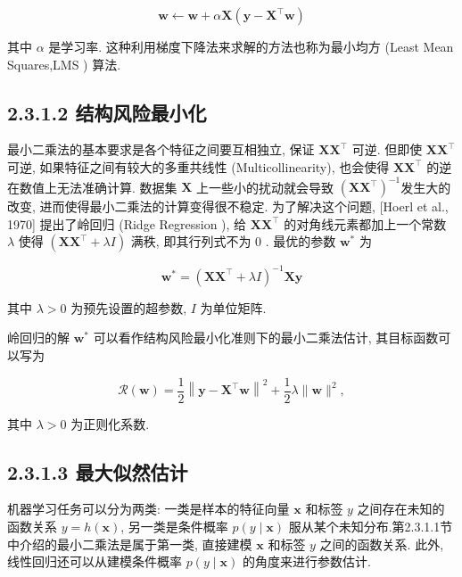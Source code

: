 \documentclass[10pt]{article}
\begin{document}
\begin{equation*}
\boldsymbol{w} \leftarrow \boldsymbol{w}+\alpha \boldsymbol{X}\left(\boldsymbol{y}-\boldsymbol{X}^{\top} \boldsymbol{w}\right) \tag{2.42}
\end{equation*}


其中 $\alpha$ 是学习率. 这种利用梯度下降法来求解的方法也称为最小均方 (Least Mean Squares,LMS ) 算法.

\subsection*{2.3.1.2 结构风险最小化}
最小二乘法的基本要求是各个特征之间要互相独立, 保证 $\boldsymbol{X} \boldsymbol{X}^{\top}$ 可逆. 但即使 $\boldsymbol{X} \boldsymbol{X}^{\top}$ 可逆, 如果特征之间有较大的多重共线性 (Multicollinearity), 也会使得 $\boldsymbol{X} \boldsymbol{X}^{\top}$ 的逆在数值上无法准确计算. 数据集 $\boldsymbol{X}$ 上一些小的扰动就会导致 $\left(\boldsymbol{X} \boldsymbol{X}^{\top}\right)^{-1}$发生大的改变, 进而使得最小二乘法的计算变得很不稳定. 为了解决这个问题, [Hoerl et al., 1970] 提出了岭回归 (Ridge Regression ), 给 $\boldsymbol{X} \boldsymbol{X}^{\top}$ 的对角线元素都加上一个常数 $\lambda$ 使得 $\left(\boldsymbol{X} \boldsymbol{X}^{\top}+\lambda I\right)$ 满秩, 即其行列式不为 0 . 最优的参数 $\boldsymbol{w}^{*}$ 为


\begin{equation*}
\boldsymbol{w}^{*}=\left(\boldsymbol{X} \boldsymbol{X}^{\top}+\lambda I\right)^{-1} \boldsymbol{X} \boldsymbol{y} \tag{2.43}
\end{equation*}


其中 $\lambda>0$ 为预先设置的超参数, $I$ 为单位矩阵.

岭回归的解 $\boldsymbol{w}^{*}$ 可以看作结构风险最小化准则下的最小二乘法估计, 其目标函数可以写为


\begin{equation*}
\mathcal{R}(\boldsymbol{w})=\frac{1}{2}\left\|\boldsymbol{y}-\boldsymbol{X}^{\top} \boldsymbol{w}\right\|^{2}+\frac{1}{2} \lambda\|\boldsymbol{w}\|^{2}, \tag{2.44}
\end{equation*}


其中 $\lambda>0$ 为正则化系数.

\subsection*{2.3.1.3 最大似然估计}
机器学习任务可以分为两类: 一类是样本的特征向量 $\boldsymbol{x}$ 和标签 $y$ 之间存在未知的函数关系 $y=h(\boldsymbol{x})$, 另一类是条件概率 $p(y \mid \boldsymbol{x})$ 服从某个未知分布.第2.3.1.1节中介绍的最小二乘法是属于第一类, 直接建模 $\boldsymbol{x}$ 和标签 $y$ 之间的函数关系. 此外, 线性回归还可以从建模条件概率 $p(y \mid \boldsymbol{x})$ 的角度来进行参数估计.
\end{document}

